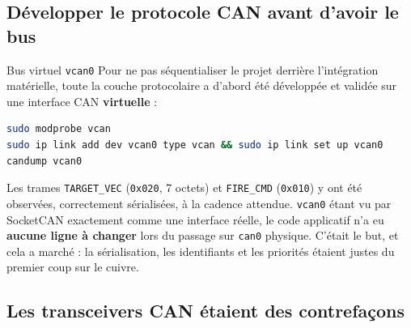 \documentclass[11pt,a4paper]{article}
\begin{document}
\subsection{Développer le protocole CAN avant d'avoir le bus}

\begin{verroulevé}{Bus virtuel \texttt{vcan0}}
Pour ne pas séquentialiser le projet derrière l'intégration matérielle, toute la couche
protocolaire a d'abord été développée et validée sur une interface CAN \textbf{virtuelle} :

\begin{lstlisting}[language=bash]
sudo modprobe vcan
sudo ip link add dev vcan0 type vcan && sudo ip link set up vcan0
candump vcan0
\end{lstlisting}

Les trames \texttt{TARGET\_VEC} (\texttt{0x020}, 7 octets) et \texttt{FIRE\_CMD}
(\texttt{0x010}) y ont été observées, correctement sérialisées, à la cadence attendue.
\texttt{vcan0} étant vu par SocketCAN exactement comme une interface réelle, le code
applicatif n'a eu \textbf{aucune ligne à changer} lors du passage sur \texttt{can0} physique.
C'était le but, et cela a marché : la sérialisation, les identifiants et les priorités étaient
justes du premier coup sur le cuivre.
\end{verroulevé}

\subsection{Les transceivers CAN étaient des contrefaçons}
\label{sec:contrefacon}
\end{document}
